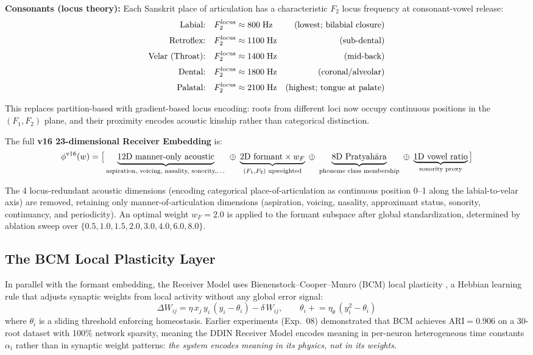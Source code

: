 \documentclass[12pt]{article}
\begin{document}
\textbf{Consonants (locus theory):} Each Sanskrit place of articulation has a characteristic $F_2$ locus frequency at consonant-vowel release:
\begin{align*}
\text{Labial:}\quad   &F_2^{\rm locus} \approx  800\;\text{Hz} &\text{(lowest; bilabial closure)}\\[2pt]
\text{Retroflex:}\quad &F_2^{\rm locus} \approx 1100\;\text{Hz} &\text{(sub-dental)}\\[2pt]
\text{Velar (Throat):}\quad &F_2^{\rm locus} \approx 1400\;\text{Hz} &\text{(mid-back)}\\[2pt]
\text{Dental:}\quad   &F_2^{\rm locus} \approx 1800\;\text{Hz} &\text{(coronal/alveolar)}\\[2pt]
\text{Palatal:}\quad  &F_2^{\rm locus} \approx 2100\;\text{Hz} &\text{(highest; tongue at palate)}
\end{align*}

This replaces partition-based with gradient-based locus encoding: roots from different loci now occupy continuous positions in the $(F_1, F_2)$ plane, and their proximity encodes acoustic kinship rather than categorical distinction.

The full \textbf{v16 23-dimensional Receiver Embedding} is:
\[
\phi^{\rm v16}(w) = \bigl[\,
\underbrace{12\text{D manner-only acoustic}}_{\text{aspiration, voicing, nasality, sonority,\ldots}}
\;\oplus\;
\underbrace{2\text{D formant} \times w_F}_{(F_1,F_2)\text{ upweighted}}
\;\oplus\;
\underbrace{8\text{D Pratyah\={a}ra}}_{\text{phoneme class membership}}
\;\oplus\;
\underbrace{1\text{D vowel ratio}}_{\text{sonority proxy}}\,\bigr]
\]

The 4 locus-redundant acoustic dimensions (encoding categorical place-of-articulation as continuous position 0--1 along the labial-to-velar axis) are removed, retaining only manner-of-articulation dimensions (aspiration, voicing, nasality, approximant status, sonority, continuancy, and periodicity). An optimal weight $w_F = 2.0$ is applied to the formant subspace after global standardization, determined by ablation sweep over $\{0.5, 1.0, 1.5, 2.0, 3.0, 4.0, 6.0, 8.0\}$.

\subsection{The BCM Local Plasticity Layer}

In parallel with the formant embedding, the Receiver Model uses Bienenstock--Cooper--Munro (BCM) local plasticity \cite{bienenstock1982}, a Hebbian learning rule that adjusts synaptic weights from local activity without any global error signal:
\[
\Delta W_{ij} = \eta\,x_j\,y_i\,(y_i - \theta_i) - \delta\,W_{ij},
\qquad
\theta_i \mathrel{+}= \eta_\theta\,(y_i^2 - \theta_i)
\]
where $\theta_i$ is a sliding threshold enforcing homeostasis. Earlier experiments (Exp.~08) demonstrated that BCM achieves ARI${}=0.906$ on a 30-root dataset with 100\% network sparsity, meaning the DDIN Receiver Model encodes meaning in per-neuron heterogeneous time constants $\alpha_i$ rather than in synaptic weight patterns: \textit{the system encodes meaning in its physics, not in its weights.}
\end{document}
